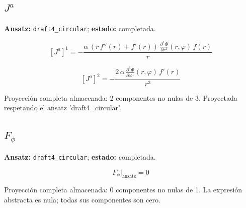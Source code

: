 \documentclass[11pt]{article}
\begin{document}
\subsection*{$ J^a $}
\textbf{Ansatz:} \texttt{draft4\_circular}; \textbf{estado:} completada.\par
\begin{dmath*}[breakdepth={5}]
\left[J^a\right]^{1} = -\frac{\alpha\,\left(r\,f''\!\left(r\right) + f'\!\left(r\right)\right)\,\frac{\partial^{1} \Phi}{\partial r^{1}}\!\left(r, \varphi\right)\,f\!\left(r\right)}{r}
\end{dmath*}
\par\smallskip
\begin{dmath*}[breakdepth={5}]
\left[J^a\right]^{2} = -\frac{2\,\alpha\,\frac{\partial^{1} \Phi}{\partial \varphi^{1}}\!\left(r, \varphi\right)\,f'\!\left(r\right)}{{r}^{3}}
\end{dmath*}
\par\smallskip
Proyección completa almacenada: 2 componentes no nulas de 3. Proyectada respetando el ansatz 'draft4\_circular'.\par\medskip
{}
\subsection*{$ F_{\phi} $}
\textbf{Ansatz:} \texttt{draft4\_circular}; \textbf{estado:} completada.\par
\begin{dmath*}[breakdepth={5}]
F_{\phi}\big|_{\mathrm{ansatz}} = 0
\end{dmath*}
\par\smallskip
Proyección completa almacenada: 0 componentes no nulas de 1. La expresión abstracta es nula; todas sus componentes son cero.\par\medskip
{}
\end{document}
